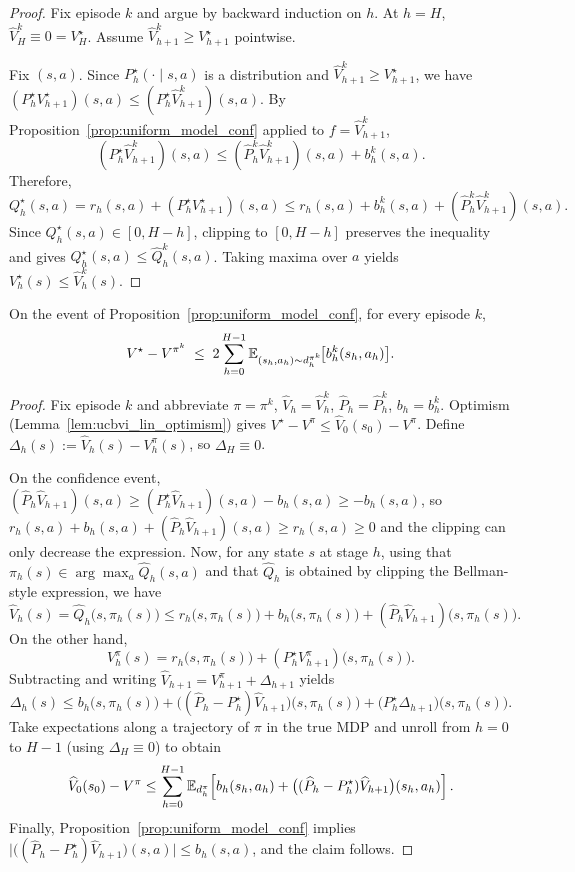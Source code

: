 \begin{proof}
Fix episode $k$ and argue by backward induction on $h$.
At $h=H$, $\widehat V_H^k\equiv 0 = V_H^\star$.
Assume $\widehat V_{h+1}^k\ge V_{h+1}^\star$ pointwise.

Fix $(s,a)$.  Since $P_h^\star(\cdot\mid s,a)$ is a distribution and
$\widehat V_{h+1}^k\ge V_{h+1}^\star$, we have
$(P_h^\star V_{h+1}^\star)(s,a)\le (P_h^\star \widehat V_{h+1}^k)(s,a)$.
By Proposition~\ref{prop:uniform_model_conf} applied to $f=\widehat V_{h+1}^k$,
\[
(P_h^\star \widehat V_{h+1}^k)(s,a)
\le
(\widehat P_h^k \widehat V_{h+1}^k)(s,a) + b_h^k(s,a).
\]
Therefore,
\[
Q_h^\star(s,a)
=
r_h(s,a) + (P_h^\star V_{h+1}^\star)(s,a)
\le
r_h(s,a) + b_h^k(s,a) + (\widehat P_h^k\widehat V_{h+1}^k)(s,a).
\]
Since $Q_h^\star(s,a)\in[0,H-h]$, clipping to $[0,H-h]$ preserves the inequality and gives
$Q_h^\star(s,a)\le \widehat Q_h^k(s,a)$.  Taking maxima over $a$ yields
$V_h^\star(s)\le \widehat V_h^k(s)$.
\end{proof}

\begin{lemma}\label{lem:ucbvi_lin_per_episode}
On the event of Proposition~\ref{prop:uniform_model_conf}, for every episode $k$,
\[
V^\star - V^{\pi^k}
\;\le\;
2\sum_{h=0}^{H-1}\mathbb{E}_{(s_h,a_h)\sim d_h^{\pi^k}}\!\big[b_h^k(s_h,a_h)\big].
\]
\end{lemma}

\begin{proof}
Fix episode $k$ and abbreviate $\pi=\pi^k$, $\widehat V_h=\widehat V_h^k$, $\widehat P_h=\widehat P_h^k$,
$b_h=b_h^k$.  Optimism (Lemma~\ref{lem:ucbvi_lin_optimism}) gives
$V^\star - V^\pi \le \widehat V_0(s_0)-V^\pi$.
Define $\Delta_h(s):=\widehat V_h(s)-V_h^\pi(s)$, so $\Delta_H\equiv 0$.

On the confidence event, $(\widehat P_h\widehat V_{h+1})(s,a)\ge (P_h^\star\widehat V_{h+1})(s,a)-b_h(s,a)\ge -b_h(s,a)$,
so $r_h(s,a)+b_h(s,a)+(\widehat P_h\widehat V_{h+1})(s,a)\ge r_h(s,a)\ge 0$ and the clipping can only decrease the expression. Now, for any state $s$ at stage $h$, using that $\pi_h(s)\in\arg\max_a \widehat Q_h(s,a)$ and that
$\widehat Q_h$ is obtained by clipping the Bellman-style expression, we have
\[
\widehat V_h(s)
=
\widehat Q_h\bigl(s,\pi_h(s)\bigr)
\le
r_h\bigl(s,\pi_h(s)\bigr) + b_h\bigl(s,\pi_h(s)\bigr)
+ (\widehat P_h \widehat V_{h+1})\bigl(s,\pi_h(s)\bigr).
\]
On the other hand,
\[
V_h^\pi(s)= r_h\bigl(s,\pi_h(s)\bigr) + (P_h^\star V_{h+1}^\pi)\bigl(s,\pi_h(s)\bigr).
\]
Subtracting and writing $\widehat V_{h+1}=V_{h+1}^\pi+\Delta_{h+1}$ yields
\[
\Delta_h(s)
\le
b_h\bigl(s,\pi_h(s)\bigr)
+\bigl((\widehat P_h-P_h^\star)\widehat V_{h+1}\bigr)\bigl(s,\pi_h(s)\bigr)
+\bigl(P_h^\star \Delta_{h+1}\bigr)\bigl(s,\pi_h(s)\bigr).
\]
Take expectations along a trajectory of $\pi$ in the true MDP and unroll from $h=0$ to $H-1$
(using $\Delta_H\equiv 0$) to obtain
\[
\widehat V_0(s_0)-V^\pi
\le
\sum_{h=0}^{H-1}\mathbb{E}_{d_h^\pi}\!\left[
b_h(s_h,a_h) + \bigl((\widehat P_h-P_h^\star)\widehat V_{h+1}\bigr)(s_h,a_h)
\right].
\]
Finally, Proposition~\ref{prop:uniform_model_conf} implies
$\big|\big((\widehat P_h-P_h^\star)\widehat V_{h+1}\big)(s,a)\big|\le b_h(s,a)$, and the claim follows.
\end{proof}

